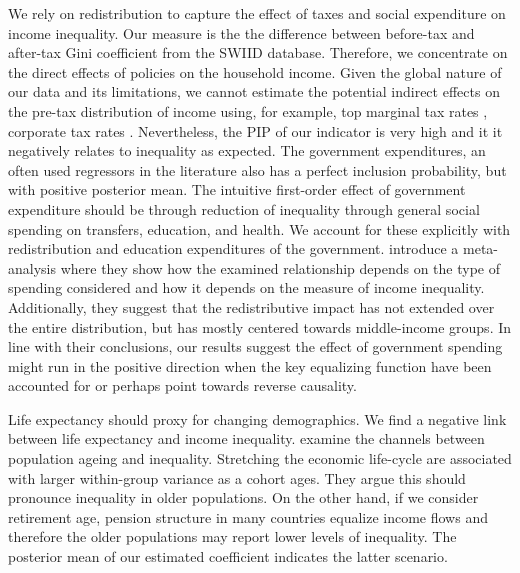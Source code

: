 \documentclass[preprint, nonatbib, 10pt]{elsarticle}
\begin{document}
We rely on redistribution to capture the effect of taxes and social expenditure on income inequality. Our measure is the the difference between before-tax and after-tax Gini coefficient from the \ac{SWIID} database. Therefore, we concentrate on the direct effects of policies on the household income. Given the global nature of our data and its limitations, we cannot estimate the potential indirect effects on the pre-tax distribution of income using, for example, top marginal tax rates \parencite{alvaredoetal2013}, corporate tax rates \parencite{fuest2018higher}. Nevertheless, the \ac{PIP} of our indicator is very high and it it negatively relates to inequality as expected. The government expenditures, an often used regressors in the literature also has a perfect inclusion probability, but with positive posterior mean. The intuitive first-order effect of government expenditure should be through reduction of inequality through general social spending on transfers, education, and health. We account for these explicitly with redistribution and education expenditures of the government. \textcite{anderson2017does} introduce a meta-analysis where they show how the examined relationship depends on the type of spending considered and how it depends on the measure of income inequality. Additionally, they suggest that the redistributive impact has not extended over the entire distribution, but has mostly centered towards middle-income groups. In line with their conclusions, our results suggest the effect of government spending might run in the positive direction when the key equalizing function have been accounted for or perhaps point towards reverse causality.

Life expectancy should proxy for changing demographics. We find a negative link between life expectancy and income inequality. \textcite{goldsteinlee2014} examine the channels between population ageing and inequality. Stretching the economic life-cycle are associated with larger within-group variance as a cohort ages. They argue this should pronounce inequality in older populations. On the other hand, if we consider retirement age, pension structure in many countries equalize income flows and therefore the older populations may report lower levels of inequality. The posterior mean of our estimated coefficient indicates the latter scenario.
\end{document}
